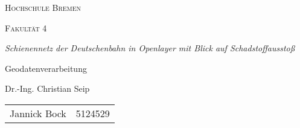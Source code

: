 \documentclass{article}
\begin{document}
\begin{titlepage}
        \begin{center}
                {\scshape\LARGE Hochschule Bremen \par}
                \vspace{1cm}
                {\scshape\Large Fakultät 4 \par}
                \vspace{1cm}
                {\Large\itshape Schienennetz der Deutschenbahn in Openlayer mit Blick auf Schadstoffausstoß\par}
                \vspace{1cm}
                {\rmfamily\large  Geodatenverarbeitung \par}
                {\rmfamily\large  Dr.-Ing. Christian Seip\par}
                \vspace{2cm}
                {\large
                        \begin{tabular}{ll}
                        Jannick Bock & 5124529\\
                \end{tabular}
                }
        \end{center}
        \vfill
\end{titlepage}

\pagebreak
\tableofcontents
\pagebreak





\lstlistoflistings
{}
\listoffigures
\printbibliography
\end{document}
